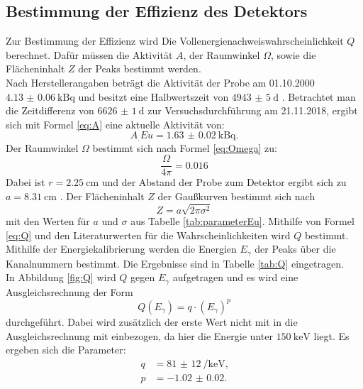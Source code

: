 \subsection{Bestimmung der Effizienz des Detektors}

Zur Bestimmung der Effizienz wird Die Vollenergienachweiswahrscheinlichkeit $Q$ berechnet. Dafür müssen die Aktivität $A$, der Raumwinkel $\Omega$, sowie die Flächeninhalt $Z$ der Peaks bestimmt werden.\\
Nach Herstellerangaben beträgt die Aktivität der Probe am 01.10.2000 $\SI{4.13(6)}{\kilo\becquerel}$ und besitzt eine Halbwertszeit von $\SI{4943(5)}{\day}$ \cite{V18}. Betrachtet man die Zeitdifferenz von $\SI{6626(1)}{\day}$ zur Versuchsdurchführung am 21.11.2018, ergibt sich mit Formel \eqref{eq:A} eine aktuelle Aktivität von:
\[
A_.{Eu}=\SI{1.63(2)}{\kilo\becquerel}\text{.}
\]
Der Raumwinkel $\Omega$ bestimmt sich nach Formel \eqref{eq:Omega} zu:
\[
\frac{\Omega}{4\pi} = 0.016
\]
Dabei ist $r=\SI{2.25}{\centi\metre}$ und der Abstand der Probe zum Detektor ergibt sich zu $a=\SI{8.31}{\centi\metre}$ \cite{V18}.
Der Flächeninhalt $Z$ der Gaußkurven bestimmt sich nach
\begin{equation}
Z = a\sqrt{2\pi\sigma^2} \label{eq:I_Gaus}
\end{equation}
mit den Werten für $a$ und $\sigma$ aus Tabelle \ref{tab:parameterEu}.
Mithilfe von Formel \eqref{eq:Q} und den Literaturwerten für die Wahrscheinlichkeiten \cite{MARTIN20131497} wird $Q$ bestimmt.
Mithilfe der Energiekalibrierung werden die Energien $E_\gamma$ der Peaks über die Kanalnummern bestimmt. Die Ergebnisse sind in Tabelle \ref{tab:Q} eingetragen.\\
In Abbildung \ref{fig:Q} wird $Q$ gegen $E_\gamma$ aufgetragen und es wird eine Ausgleichsrechnung der Form
\[
Q(E_\gamma)=q\cdot (E_\gamma)^p
\] 
durchgeführt. Dabei wird zusätzlich der erste Wert nicht mit in die Ausgleichsrechnung mit einbezogen, da hier die Energie unter $\SI{150}{\kilo\electronvolt}$ liegt.  
Es ergeben sich die Parameter:
\begin{align*}
q	&=	\SI{81(12)}{\per\kilo\electronvolt}\text{,}\\
p	&=	\num{-1.02(2)}\text{.}
\end{align*}

